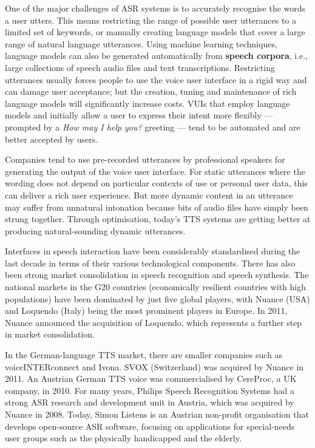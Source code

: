 \documentclass[]{../../metanetpaper}
\begin{document}
\begin{Parallel}[c]{79mm}{78mm}
{    One of the major challenges of ASR systems is to accurately recognise the words a user utters. This means restricting the range of possible user utterances to a limited set of keywords, or manually creating language models that cover a large range of natural language utterances. Using machine learning techniques, language models can also be generated automatically from \textbf{speech corpora}, i.e., large collections of speech audio files and text transcriptions. Restricting utterances usually forces people to use the voice user interface in a rigid way and can damage user acceptance; but the creation, tuning and maintenance of rich language models will significantly increase costs. VUIs that employ language models and initially allow a user to express their intent more flexibly — prompted by a \textit{How may I help you?} greeting — tend to be automated and are better accepted by users. 

    Companies tend to use pre-recorded utterances by professional speakers for generating the output of the voice user interface. For static utterances where the wording does not depend on particular contexts of use or personal user data, this can deliver a rich user experience. But more dynamic content in an utterance may suffer from unnatural intonation because bits of audio files have simply been strung together. Through optimisation, today’s TTS systems are getting better at producing natural-sounding dynamic utterances. 

    Interfaces in speech interaction have been considerably standardised during the last decade in terms of their various technological components. There has also been strong market consolidation in speech recognition and speech synthesis. The national markets in the G20 countries (economically resilient countries with high populations) have been dominated by just five global players, with Nuance (USA) and Loquendo (Italy) being the most prominent players in Europe. In 2011, Nuance announced the acquisition of Loquendo, which represents a further step in market consolidation.

    In the German-language TTS market, there are smaller companies such as voiceINTERconnect and Ivona. SVOX (Switzerland) was acquired by Nuance in 2011. An Austrian German TTS voice was commercialised by CereProc, a UK company, in 2010. For many years, Philips Speech Recognition Systems had a strong ASR research and development unit in Austria, which was acquired by Nuance in 2008. Today, Simon Listens is an Austrian non-profit organisation that develops open-source ASR software, focusing on applications for special-needs user groups such as the physically handicapped and the elderly.

}
\end{Parallel}
\end{document}

